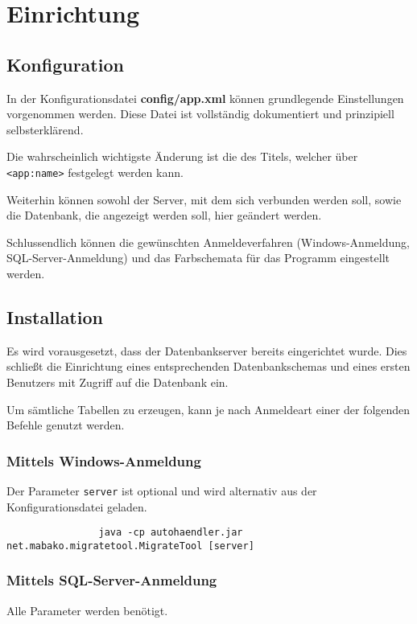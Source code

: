 \chapter{Einrichtung}
	\section{Konfiguration}
		In der Konfigurationsdatei \textbf{config/app.xml} können grundlegende
		Einstellungen vorgenommen werden. Diese Datei ist vollständig dokumentiert und
		prinzipiell selbsterklärend.
		
		Die wahrscheinlich wichtigste Änderung ist die des Titels, welcher über
		\texttt{<app:name>} festgelegt werden kann.
		
		Weiterhin können sowohl der Server, mit dem sich verbunden werden soll, sowie
		die Datenbank, die angezeigt werden soll, hier geändert werden.
		
		Schlussendlich können die gewünschten Anmeldeverfahren (Windows-Anmeldung,
		SQL-Server-Anmeldung) und das Farbschemata für das Programm eingestellt
		werden.
	
	\section{Installation}
		Es wird vorausgesetzt, dass der Datenbankserver bereits eingerichtet wurde.
		Dies schließt die Einrichtung eines entsprechenden Datenbankschemas und eines
		ersten Benutzers mit Zugriff auf die Datenbank ein.
		
		Um sämtliche Tabellen zu erzeugen, kann je nach Anmeldeart einer der folgenden
		Befehle genutzt werden.
		
		\subsection*{Mittels Windows-Anmeldung}
			Der Parameter \texttt{server} ist optional und wird alternativ aus der
			Konfigurationsdatei geladen.
			
			\begin{verbatim}
				java -cp autohaendler.jar net.mabako.migratetool.MigrateTool [server]
			\end{verbatim}
		
		\subsection*{Mittels SQL-Server-Anmeldung}
			Alle Parameter werden benötigt.
			
